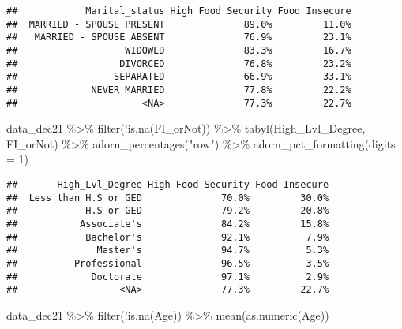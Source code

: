 \documentclass[
]{article}
\newenvironment{Shaded}{\begin{snugshade}}{\end{snugshade}}
\newcommand{\AttributeTok}[1]{\textcolor[rgb]{0.77,0.63,0.00}{#1}}
\newcommand{\DecValTok}[1]{\textcolor[rgb]{0.00,0.00,0.81}{#1}}
\newcommand{\FunctionTok}[1]{\textcolor[rgb]{0.00,0.00,0.00}{#1}}
\newcommand{\NormalTok}[1]{#1}
\newcommand{\SpecialCharTok}[1]{\textcolor[rgb]{0.00,0.00,0.00}{#1}}
\newcommand{\StringTok}[1]{\textcolor[rgb]{0.31,0.60,0.02}{#1}}
\begin{document}
\begin{verbatim}
##            Marital_status High Food Security Food Insecure
##  MARRIED - SPOUSE PRESENT              89.0%         11.0%
##   MARRIED - SPOUSE ABSENT              76.9%         23.1%
##                   WIDOWED              83.3%         16.7%
##                  DIVORCED              76.8%         23.2%
##                 SEPARATED              66.9%         33.1%
##             NEVER MARRIED              77.8%         22.2%
##                      <NA>              77.3%         22.7%
\end{verbatim}

\begin{Shaded}
\begin{Highlighting}[]
\NormalTok{data\_dec21 }\SpecialCharTok{\%\textgreater{}\%} \FunctionTok{filter}\NormalTok{(}\SpecialCharTok{!}\FunctionTok{is.na}\NormalTok{(FI\_orNot)) }\SpecialCharTok{\%\textgreater{}\%} 
\FunctionTok{tabyl}\NormalTok{(High\_Lvl\_Degree, FI\_orNot) }\SpecialCharTok{\%\textgreater{}\%} 
  \FunctionTok{adorn\_percentages}\NormalTok{(}\StringTok{"row"}\NormalTok{) }\SpecialCharTok{\%\textgreater{}\%} 
  \FunctionTok{adorn\_pct\_formatting}\NormalTok{(}\AttributeTok{digits =} \DecValTok{1}\NormalTok{)}
\end{Highlighting}
\end{Shaded}

\begin{verbatim}
##       High_Lvl_Degree High Food Security Food Insecure
##  Less than H.S or GED              70.0%         30.0%
##            H.S or GED              79.2%         20.8%
##           Associate's              84.2%         15.8%
##            Bachelor's              92.1%          7.9%
##              Master's              94.7%          5.3%
##          Professional              96.5%          3.5%
##             Doctorate              97.1%          2.9%
##                  <NA>              77.3%         22.7%
\end{verbatim}

\begin{Shaded}
\begin{Highlighting}[]
\NormalTok{data\_dec21 }\SpecialCharTok{\%\textgreater{}\%} \FunctionTok{filter}\NormalTok{(}\SpecialCharTok{!}\FunctionTok{is.na}\NormalTok{(Age)) }\SpecialCharTok{\%\textgreater{}\%} \FunctionTok{mean}\NormalTok{(}\FunctionTok{as.numeric}\NormalTok{(Age))}
\end{Highlighting}
\end{Shaded}
\end{document}
